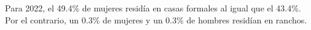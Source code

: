 Para 2022, el 49.4\% de mujeres residía en casas formales al igual que el 43.4\%. Por el contrario, un 0.3\% de mujeres y un 0.3\% de hombres residían en ranchos.  